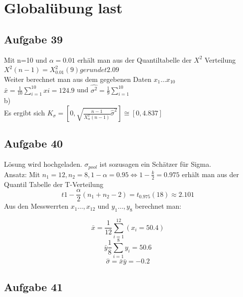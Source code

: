 \documentclass[10pt,a4paper]{article}
\begin{document}
\section{Globalübung last}
\subsection{Aufgabe 39}
Mit n=10 und $\alpha = 0.01$ erhält man aus der Quantiltabelle der $X^2$ Verteilung $X^2(n-1)=X^2_{0.01}(9) gerundet 2.09$\\
Weiter berechnet man aus dem gegebenen Daten $x_1\dots x_{10}$\\
$\bar{x} = \frac{1}{10} \sum_{i=1}^{10}xi =124.9$ und $\hat{\sigma^2}=\frac{1}{9}\sum_{i=1}^{10}$\\

b)\\ Es ergibt sich $K_{\sigma} = [0,\sqrt{\frac{n-1}{X^2_\alpha(n-1)}\hat\sigma^2}] \cong [0,4.837]$
\subsection{Aufgabe 40}
Lösung wird hochgeladen. $\sigma_{pool}$ ist sozusagen ein Schätzer für Sigma. \\Ansatz: Mit $n_1 = 12, n_2=8, 1-\alpha=0.95 \Leftrightarrow 1- \frac{k}{2} = 0.975$ erhält man aus der Quantil Tabelle der T-Verteilung $$t{1-\frac{\alpha}{2}} (n_1+n_2 - 2) = t_{0.975} (18) \approx 2.101 $$
Aus den Messwerrten $x_1\dots,x_{12}$ und  $y_1\dots,y_{8}$ berechnet man: 

$$\bar{x}=\frac{1}{12}\sum_{i=1}^{12} (x_i = 50.4) $$ $$\bar{y}\frac{1}{8}\sum_{i=1}^{8} y_i = 50.6$$ $$\hat{\sigma}=\bar {x}\bar{y}=-0.2$$

\subsection{Aufgabe 41}
\end{document}
